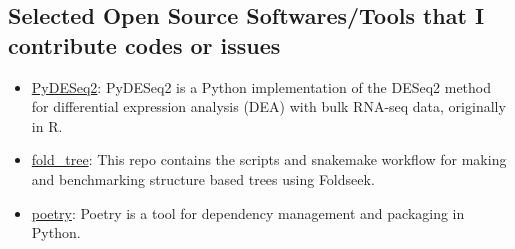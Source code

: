\subsection*{\textbf{Selected Open Source Softwares/Tools that I contribute codes or issues}}
\begin{itemize}
    \item \href{https://github.com/owkin/PyDESeq2}{PyDESeq2}: PyDESeq2 is a Python implementation of the DESeq2 method for differential 
    expression analysis (DEA) with bulk RNA-seq data, originally in R.
    \item \href{https://github.com/DessimozLab/fold_tree}{fold\_tree}: This repo contains the scripts and snakemake workflow for making and benchmarking structure based trees using Foldseek.
    \item \href{https://github.com/python-poetry/poetry}{poetry}: Poetry is a tool for dependency management and packaging in Python.
\end{itemize}
